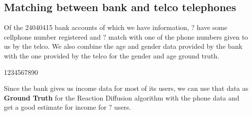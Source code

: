 \subsection{Matching between bank and telco telephones}

Of the \num{24040415} bank accounts of which we have information, \( ? \) have some cellphone number registered and \( ? \) match with one of the phone numbers given to us by the telco. We also combine the age and gender data provided by the bank with the one provided by the telco for the gender and age ground truth.

\num[group-separator={,}]{1234567890}

Since the bank gives us income data for most of its users, we can use that data as \textbf{Ground Truth} for the Reaction Diffusion algorithm with the phone data and get a good estimate for income for \( ? \) users.
